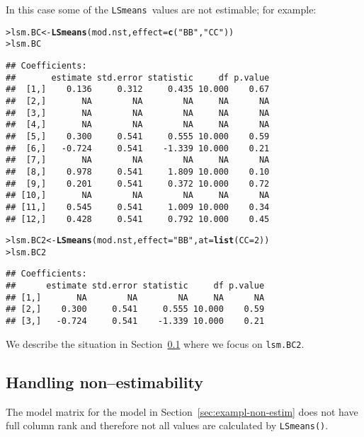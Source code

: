 \documentclass[11pt]{article}\usepackage[]{graphicx}\usepackage[]{color}
\makeatletter
\newcommand{\hlnum}[1]{\textcolor[rgb]{0.686,0.059,0.569}{#1}}%
\newcommand{\hlstr}[1]{\textcolor[rgb]{0.192,0.494,0.8}{#1}}%
\newcommand{\hlstd}[1]{\textcolor[rgb]{0.345,0.345,0.345}{#1}}%
\newcommand{\hlkwb}[1]{\textcolor[rgb]{0.69,0.353,0.396}{#1}}%
\newcommand{\hlkwc}[1]{\textcolor[rgb]{0.333,0.667,0.333}{#1}}%
\newcommand{\hlkwd}[1]{\textcolor[rgb]{0.737,0.353,0.396}{\textbf{#1}}}%
\newenvironment{kframe}{%
 \def\at@end@of@kframe{}%
 \ifinner\ifhmode%
  \def\at@end@of@kframe{\end{minipage}}%
  \begin{minipage}{\columnwidth}%
 \fi\fi%
 \def\FrameCommand##1{\hskip\@totalleftmargin \hskip-\fboxsep
 \colorbox{shadecolor}{##1}\hskip-\fboxsep
     \hskip-\linewidth \hskip-\@totalleftmargin \hskip\columnwidth}%
 \MakeFramed {\advance\hsize-\width
   \@totalleftmargin\z@ \linewidth\hsize
   \@setminipage}}%
 {\par\unskip\endMakeFramed%
 \at@end@of@kframe}
\newenvironment{knitrout}{}{} %
\def\code#1{\texttt{#1}}
\def\cc#1{\texttt{#1}}
\def\lsmeans{\code{LSmeans}}
\renewenvironment{knitrout}{
  \begin{oldknitrout}
    \footnotesize
    \topsep=0pt
}{
  \end{oldknitrout}
}
\makeatother
\begin{document}
In this case some of the \lsmeans\ values are not estimable; for example:
\begin{knitrout}
\color{fgcolor}\begin{kframe}
\begin{alltt}
\hlstd{> }\hlstd{lsm.BC} \hlkwb{<-} \hlkwd{LSmeans}\hlstd{(mod.nst,} \hlkwc{effect}\hlstd{=}\hlkwd{c}\hlstd{(}\hlstr{"BB"}\hlstd{,} \hlstr{"CC"}\hlstd{))}
\hlstd{> }\hlstd{lsm.BC}
\end{alltt}
\begin{verbatim}
## Coefficients:
##       estimate std.error statistic     df p.value
##  [1,]    0.136     0.312     0.435 10.000    0.67
##  [2,]       NA        NA        NA     NA      NA
##  [3,]       NA        NA        NA     NA      NA
##  [4,]       NA        NA        NA     NA      NA
##  [5,]    0.300     0.541     0.555 10.000    0.59
##  [6,]   -0.724     0.541    -1.339 10.000    0.21
##  [7,]       NA        NA        NA     NA      NA
##  [8,]    0.978     0.541     1.809 10.000    0.10
##  [9,]    0.201     0.541     0.372 10.000    0.72
## [10,]       NA        NA        NA     NA      NA
## [11,]    0.545     0.541     1.009 10.000    0.34
## [12,]    0.428     0.541     0.792 10.000    0.45
\end{verbatim}
\begin{alltt}
\hlstd{> }\hlstd{lsm.BC2} \hlkwb{<-} \hlkwd{LSmeans}\hlstd{(mod.nst,} \hlkwc{effect}\hlstd{=}\hlstr{"BB"}\hlstd{,} \hlkwc{at}\hlstd{=}\hlkwd{list}\hlstd{(}\hlkwc{CC}\hlstd{=}\hlnum{2}\hlstd{))}
\hlstd{> }\hlstd{lsm.BC2}
\end{alltt}
\begin{verbatim}
## Coefficients:
##      estimate std.error statistic     df p.value
## [1,]       NA        NA        NA     NA      NA
## [2,]    0.300     0.541     0.555 10.000    0.59
## [3,]   -0.724     0.541    -1.339 10.000    0.21
\end{verbatim}
\end{kframe}
\end{knitrout}

We describe the situation in 
Section~\ref{sec:handl-non-estim} where we focus on \verb|lsm.BC2|.

\subsection{Handling non--estimability}
\label{sec:handl-non-estim}

The model matrix for the model in Section~\ref{sec:exampl-non-estim}
does not have full column rank and therefore not all values are
calculated by \cc{LSmeans()}.
\end{document}

